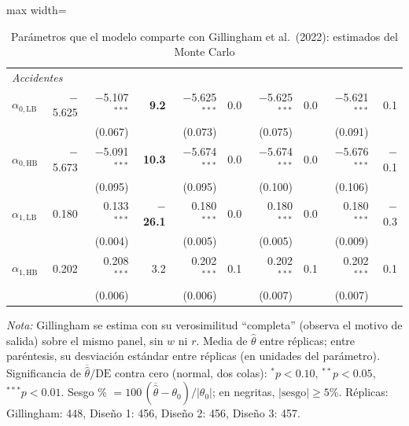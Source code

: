 \begin{table}[htbp]
\begin{adjustbox}{max width=\textwidth}
\begin{tabular}{l r rr rr rr rr}
\multicolumn{10}{l}{\textit{Accidentes}}\\
$\alpha_{0,\text{LB}}$ & $-$5.625 & $-$5.107$^{***}$ & \textbf{9.2} & $-$5.625$^{***}$ & 0.0 & $-$5.625$^{***}$ & 0.0 & $-$5.621$^{***}$ & 0.1\\
 &  & (0.067) &  & (0.073) &  & (0.075) &  & (0.091) & \\[1pt]
$\alpha_{0,\text{HB}}$ & $-$5.673 & $-$5.091$^{***}$ & \textbf{10.3} & $-$5.674$^{***}$ & 0.0 & $-$5.674$^{***}$ & 0.0 & $-$5.676$^{***}$ & $-$0.1\\
 &  & (0.095) &  & (0.095) &  & (0.100) &  & (0.106) & \\[1pt]
$\alpha_{1,\text{LB}}$ & 0.180 & 0.133$^{***}$ & \textbf{$-$26.1} & 0.180$^{***}$ & 0.0 & 0.180$^{***}$ & 0.0 & 0.180$^{***}$ & $-$0.3\\
 &  & (0.004) &  & (0.005) &  & (0.005) &  & (0.009) & \\[1pt]
$\alpha_{1,\text{HB}}$ & 0.202 & 0.208$^{***}$ & 3.2 & 0.202$^{***}$ & 0.1 & 0.202$^{***}$ & 0.1 & 0.202$^{***}$ & 0.1\\
 &  & (0.006) &  & (0.006) &  & (0.007) &  & (0.007) & \\[1pt]
\bottomrule
\end{tabular}
\end{adjustbox}
\caption{Parámetros que el modelo comparte con Gillingham et al.\ (2022): estimados del Monte Carlo}
\label{tab:mc-comunes}
\par\smallskip
\begin{minipage}{\textwidth}\footnotesize
\textit{Nota:} Gillingham se estima con su verosimilitud ``completa'' (observa el motivo de salida) sobre el mismo panel, sin $w$ ni $r$. Media de $\hat\theta$ entre réplicas;
entre paréntesis, su desviación estándar entre réplicas (en unidades del parámetro).
Significancia de $\overline{\hat\theta}/\text{DE}$ contra cero (normal, dos colas):
$^{*}p<0.10$, $^{**}p<0.05$, $^{***}p<0.01$.
Sesgo \% $=100\,(\overline{\hat\theta}-\theta_0)/|\theta_0|$; en negritas, $|\text{sesgo}|\ge5\%$.
Réplicas: Gillingham: 448, Diseño 1: 456, Diseño 2: 456, Diseño 3: 457.
\end{minipage}
\end{table}
